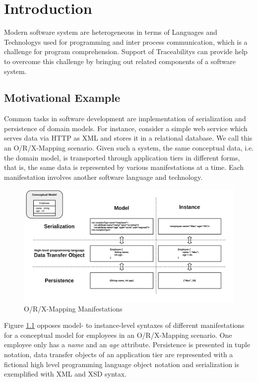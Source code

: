 \chapter{Introduction}
\label{chapter:Introduction}
Modern software system are heterogeneous in terms of \glspl{Language} and \glspl{Technology} used for programming and inter process communication, which is a challenge for program comprehension.
Support of \glspl{Traceability} can provide help to overcome this challenge by bringing out related components of a software system.

\section{Motivational Example}
Common tasks in software development are implementation of serialization and persistence of domain models.
For instance, consider a simple web service which serves data via \gls{HTTP} as \gls{XML} and stores it in a relational database.
We call this an \gls{O/R/X-Mapping} scenario.
Given such a system, the same conceptual data, i.e. the domain model, is transported through application tiers in different forms, that is, the same data is represented by various manifestations at a time.
Each manifestation involves another software language and technology.
\begin{figure}[h!]
\begin{center}
\includegraphics[width=.9\textwidth]{images/ORX.png}
\end{center}
\caption{O/R/X-Mapping Manifestations}
\label{figure:ORXManifestations}
\end{figure}
Figure \ref{figure:ORXManifestations} opposes model- to instance-level syntaxes of different manifestations for a conceptual model for employees in an \gls{O/R/X-Mapping} scenario.
One employee only has a \textit{name} and an \textit{age} attribute.
Persistence is presented in tuple notation, data transfer objects of an application tier are represented with a fictional high level programming language object notation and serialization is exemplified with \gls{XML} and \gls{XSD} syntax.

